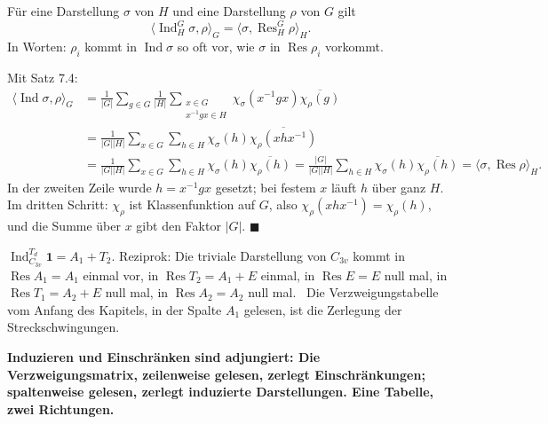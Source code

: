 \begin{merksatz}
Für eine Darstellung $\sigma$ von $H$ und eine Darstellung $\rho$ von $G$ gilt
\[ \langle\operatorname{Ind}^G_H\sigma, \rho\rangle_G = \langle\sigma, \operatorname{Res}^G_H\rho\rangle_H . \]
In Worten: $\rho_i$ kommt in $\operatorname{Ind}\sigma$ so oft vor, wie $\sigma$ in $\operatorname{Res}\rho_i$ vorkommt.

Mit Satz 7.4:
\begin{align*}
\langle\operatorname{Ind}\sigma, \rho\rangle_G &= \frac1{|G|}\sum_{g\in G}\frac1{|H|}\sum_{\substack{x\in G\\ x^{-1}gx\in H}}\chi_\sigma(x^{-1}gx)\overline{\chi_\rho(g)}\\
&= \frac1{|G||H|}\sum_{x\in G}\sum_{h\in H}\chi_\sigma(h)\overline{\chi_\rho(xhx^{-1})}\\
&= \frac1{|G||H|}\sum_{x\in G}\sum_{h\in H}\chi_\sigma(h)\overline{\chi_\rho(h)} = \frac{|G|}{|G||H|}\sum_{h\in H}\chi_\sigma(h)\overline{\chi_\rho(h)} = \langle\sigma, \operatorname{Res}\rho\rangle_H .
\end{align*}
In der zweiten Zeile wurde $h = x^{-1}gx$ gesetzt; bei festem $x$ läuft $h$ über ganz $H$. Im dritten Schritt: $\chi_\rho$ ist Klassenfunktion auf $G$, also $\chi_\rho(xhx^{-1}) = \chi_\rho(h)$, und die Summe über $x$ gibt den Faktor $|G|$. $\blacksquare$

$\operatorname{Ind}^{T_d}_{C_{3v}}\mathbf 1 = A_1 + T_2$. Reziprok: Die triviale Darstellung von $C_{3v}$ kommt in $\operatorname{Res}A_1 = A_1$ einmal vor, in $\operatorname{Res}T_2 = A_1 + E$ einmal, in $\operatorname{Res}E = E$ null mal, in $\operatorname{Res}T_1 = A_2 + E$ null mal, in $\operatorname{Res}A_2 = A_2$ null mal. \checkmark\ Die Verzweigungstabelle vom Anfang des Kapitels, in der Spalte $A_1$ gelesen, ist die Zerlegung der Streckschwingungen.

\begin{center}
\begin{minipage}{0.9\textwidth}
\textbf{Induzieren und Einschränken sind adjungiert: Die Verzweigungsmatrix, zeilenweise gelesen, zerlegt Einschränkungen; spaltenweise gelesen, zerlegt induzierte Darstellungen. Eine Tabelle, zwei Richtungen.}
\end{minipage}
\end{center}


\end{merksatz}
